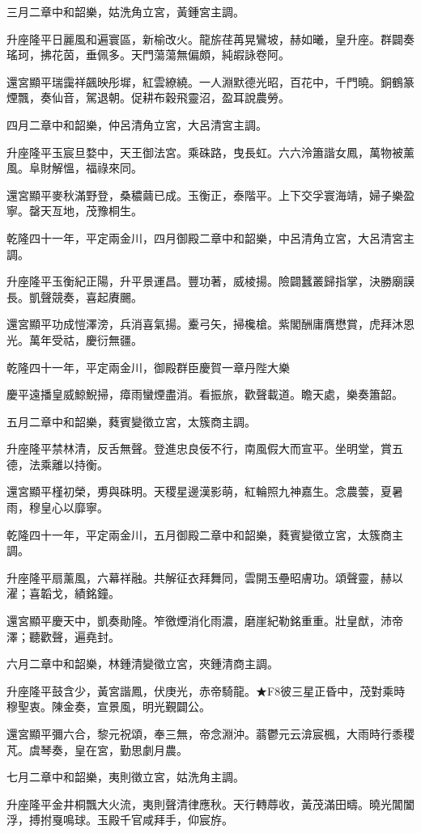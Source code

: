\begin{pinyinscope}
三月二章中和韶樂，姑洗角立宮，黃鍾宮主調。

升座隆平日麗風和遍寰區，新榆改火。龍旂荏苒晃鸞坡，赫如曦，皇升座。群闢奏瑤珂，拂花茵，垂佩多。天門蕩蕩無偏頗，純嘏詠卷阿。

還宮顯平瑞靄祥飆映彤墀，紅雲繚繞。一人淵默德光昭，百花中，千門曉。銅鶴篆煙飄，奏仙音，駕退朝。促耕布穀飛靈沼，盈耳說農勞。

四月二章中和韶樂，仲呂清角立宮，大呂清宮主調。

升座隆平玉宸旦婺中，天王御法宮。乘硃路，曳長虹。六六泠簫諧女鳳，萬物被薰風。阜財解慍，福祿來同。

還宮顯平麥秋滿野登，桑穠繭已成。玉衡正，泰階平。上下交孚寰海靖，婦子樂盈寧。罄天亙地，茂豫桐生。

乾隆四十一年，平定兩金川，四月御殿二章中和韶樂，中呂清角立宮，大呂清宮主調。

升座隆平玉衡紀正陽，升平景運昌。豐功著，威棱揚。險闢蠶叢歸指掌，決勝廟謨長。凱聲競奏，喜起賡颺。

還宮顯平功成愷澤滂，兵消喜氣揚。櫜弓矢，掃欃槍。紫閣酬庸膺懋賞，虎拜沐恩光。萬年受祜，慶衍無疆。

乾隆四十一年，平定兩金川，御殿群臣慶賀一章丹陛大樂

慶平遠播皇威鯨鯢掃，瘴雨蠻煙盡消。看振旅，歡聲載道。瞻天處，樂奏簫韶。

五月二章中和韶樂，蕤賓變徵立宮，太簇商主調。

升座隆平禁林清，反舌無聲。登進忠良佞不行，南風假大而宣平。坐明堂，賞五德，法乘離以持衡。

還宮顯平槿初榮，旉與硃明。天稷星邊漢影萌，紅輪照九神嘉生。念農蕓，夏暑雨，穆皇心以靡寧。

乾隆四十一年，平定兩金川，五月御殿二章中和韶樂，蕤賓變徵立宮，太簇商主調。

升座隆平扇薰風，六幕祥融。共解征衣拜舞同，雲開玉壘昭膚功。頌聲靈，赫以濯；喜韜戈，績銘鐘。

還宮顯平慶天中，凱奏勛隆。笮徼煙消化雨濃，磨崖紀勒銘重重。壯皇猷，沛帝澤；聽歡聲，遍堯封。

六月二章中和韶樂，林鍾清變徵立宮，夾鍾清商主調。

升座隆平鼓含少，黃宮諧鳳，伏庚光，赤帝騎龍。★F8彼三星正昏中，茂對乘時穆聖衷。陳金奏，宣景風，明光覲闢公。

還宮顯平彌六合，黎元祝頌，奉三無，帝念淵沖。蓊鬱元云渰宸楓，大雨時行黍稷芃。虞琴奏，皇在宮，勤思劇月農。

七月二章中和韶樂，夷則徵立宮，姑洗角主調。

升座隆平金井桐飄大火流，夷則聲清律應秋。天行轉蓐收，黃茂滿田疇。曉光閶闔浮，搏拊戛鳴球。玉殿千官咸拜手，仰宸斿。


\end{pinyinscope}
